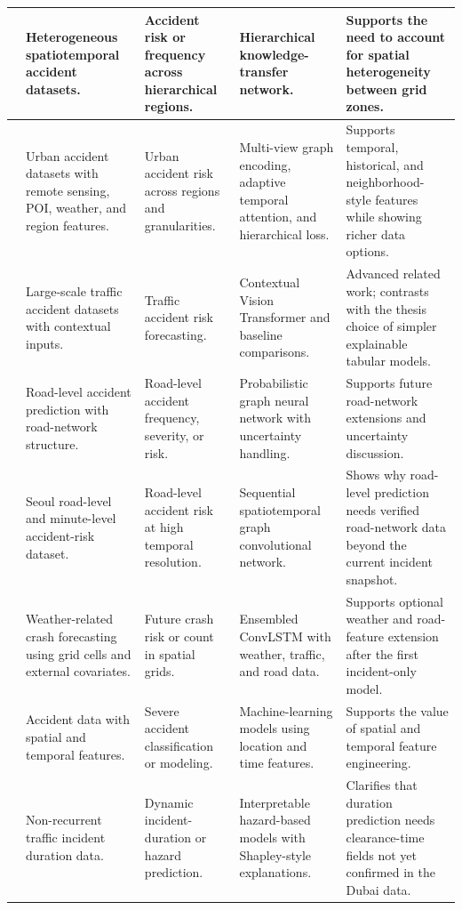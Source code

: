 \begin{longtable}{|p{0.8cm}|p{2.4cm}|p{3.0cm}|p{3.2cm}|p{3.9cm}|}
\cite{an2022hintnet} & Heterogeneous spatiotemporal accident datasets. & Accident risk or frequency across hierarchical regions. & Hierarchical knowledge-transfer network. & Supports the need to account for spatial heterogeneity between grid zones. \\ \hline
\cite{chen2024urbanrisk} & Urban accident datasets with remote sensing, POI, weather, and region features. & Urban accident risk across regions and granularities. & Multi-view graph encoding, adaptive temporal attention, and hierarchical loss. & Supports temporal, historical, and neighborhood-style features while showing richer data options. \\ \hline
\cite{saleh2022contextualvit} & Large-scale traffic accident datasets with contextual inputs. & Traffic accident risk forecasting. & Contextual Vision Transformer and baseline comparisons. & Advanced related work; contrasts with the thesis choice of simpler explainable tabular models. \\ \hline
\cite{gao2023uncertainty} & Road-level accident prediction with road-network structure. & Road-level accident frequency, severity, or risk. & Probabilistic graph neural network with uncertainty handling. & Supports future road-network extensions and uncertainty discussion. \\ \hline
\cite{kim2024sstgcn} & Seoul road-level and minute-level accident-risk dataset. & Road-level accident risk at high temporal resolution. & Sequential spatiotemporal graph convolutional network. & Shows why road-level prediction needs verified road-network data beyond the current incident snapshot. \\ \hline
\cite{ogungbire2026weather} & Weather-related crash forecasting using grid cells and external covariates. & Future crash risk or count in spatial grids. & Ensembled ConvLSTM with weather, traffic, and road data. & Supports optional weather and road-feature extension after the first incident-only model. \\ \hline
\cite{khulbe2019severe} & Accident data with spatial and temporal features. & Severe accident classification or modeling. & Machine-learning models using location and time features. & Supports the value of spatial and temporal feature engineering. \\ \hline
\cite{kalair2021duration} & Non-recurrent traffic incident duration data. & Dynamic incident-duration or hazard prediction. & Interpretable hazard-based models with Shapley-style explanations. & Clarifies that duration prediction needs clearance-time fields not yet confirmed in the Dubai data. \\ \hline

\end{longtable}
